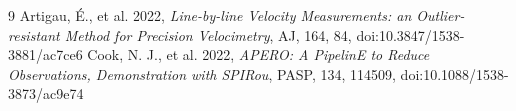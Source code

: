 \documentclass[11pt]{article}
\begin{document}
\begin{thebibliography}{9}
 Artigau, É., et al. 2022,
  \textit{Line-by-line Velocity Measurements: an Outlier-resistant Method for
  Precision Velocimetry}, AJ, 164, 84, doi:10.3847/1538-3881/ac7ce6
 Cook, N. J., et al. 2022,
  \textit{APERO: A PipelinE to Reduce Observations, Demonstration with SPIRou},
  PASP, 134, 114509, doi:10.1088/1538-3873/ac9e74
\end{thebibliography}
\end{document}
